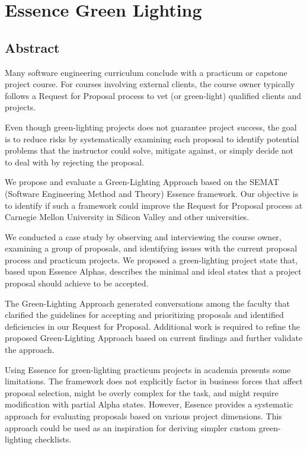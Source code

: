 \chapter{Essence Green Lighting}
\section{Abstract}

Many software engineering curriculum conclude with a
practicum or capstone project course. For courses involving external
clients, the course owner typically follows a Request for Proposal
process to vet (or green-light) qualified clients and projects.

Even though green-lighting projects does not guarantee project success, 
the goal is to reduce risks by systematically examining each proposal to identify
potential problems that the instructor could solve, mitigate against, 
or simply decide not to deal with by rejecting the proposal.

We propose and evaluate a Green-Lighting Approach based on the
SEMAT (Software Engineering Method and Theory) Essence framework. 
Our objective is to identify if such a framework could improve the Request for Proposal process 
at Carnegie Mellon University in Silicon Valley and other universities.

We conducted a case study by observing and interviewing the
course owner, examining a group of proposals, and identifying issues
with the current proposal process and practicum projects.
We proposed a green-lighting project state that, based upon Essence Alphas,
describes the minimal and ideal states that a project proposal should achieve to be accepted. 

The Green-Lighting Approach generated conversations among the faculty 
that clarified the guidelines for accepting and prioritizing proposals and identified deficiencies in our Request for Proposal. Additional work is required to refine the proposed Green-Lighting Approach based on current findings and further validate the approach.
  
Using Essence for green-lighting practicum projects in academia presents some limitations. 
The framework does not explicitly factor in business forces that affect proposal selection,
might be overly complex for the task, and might require modification with partial Alpha states. 
However, Essence provides a systematic approach for evaluating proposals based on various project dimensions. 
This approach could be used as an inspiration for deriving simpler custom green-lighting checklists. 

